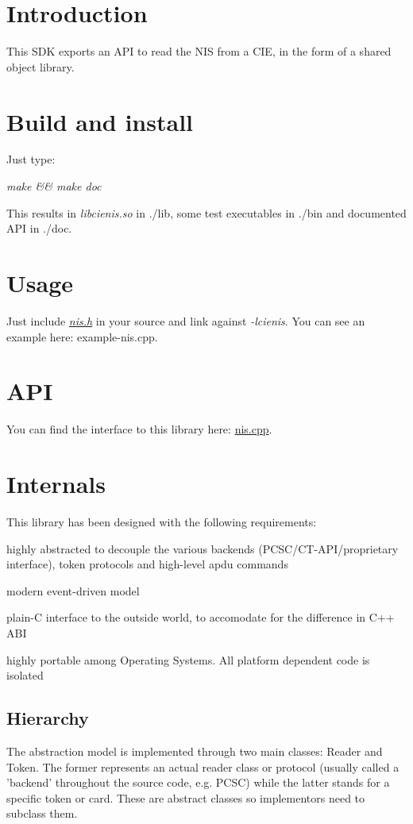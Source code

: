 \hypertarget{index_sec-intro}{}\section{Introduction}\label{index_sec-intro}
This S\-D\-K exports an A\-P\-I to read the N\-I\-S from a C\-I\-E, in the form of a shared object library.\hypertarget{index_sec-build-install}{}\section{Build and install}\label{index_sec-build-install}
Just type\-:

{\itshape make \&\& make doc}

This results in {\itshape libcienis.\-so} in {\itshape }./lib, some test executables in {\itshape }./bin and documented A\-P\-I in ./doc.\hypertarget{index_sec-usage}{}\section{Usage}\label{index_sec-usage}
Just include {\itshape \hyperlink{nis_8h_source}{nis.\-h}} in your source and link against {\itshape -\/lcienis}. You can see an example here\-: example-\/nis.\-cpp.\hypertarget{index_sec-api}{}\section{A\-P\-I}\label{index_sec-api}
You can find the interface to this library here\-: \hyperlink{nis_8cpp}{nis.\-cpp}.\hypertarget{index_sec-internals}{}\section{Internals}\label{index_sec-internals}
This library has been designed with the following requirements\-:
\begin{DoxyItemize}
\item highly abstracted to decouple the various backends (P\-C\-S\-C/\-C\-T-\/\-A\-P\-I/proprietary interface), token protocols and high-\/level apdu commands
\item modern event-\/driven model
\item plain-\/\-C interface to the outside world, to accomodate for the difference in C++ A\-B\-I
\item highly portable among Operating Systems. All platform dependent code is isolated
\end{DoxyItemize}\hypertarget{index_subsec-hierarchy}{}\subsection{Hierarchy}\label{index_subsec-hierarchy}
The abstraction model is implemented through two main classes\-: Reader and Token. The former represents an actual reader class or protocol (usually called a 'backend' throughout the source code, e.\-g. P\-C\-S\-C) while the latter stands for a specific token or card. These are abstract classes so implementors need to subclass them.

